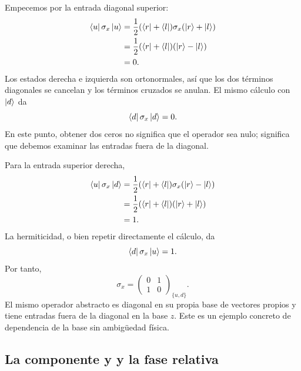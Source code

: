 Empecemos por la entrada diagonal superior:
\begin{align}
\left\langle u\right\rvert\sigma_x\left\lvert u\right\rangle
 &=\frac12(\left\langle r\right\rvert+\left\langle l\right\rvert)\sigma_x(\left\lvert r\right\rangle+\left\lvert l\right\rangle)\\
 &=\frac12(\left\langle r\right\rvert+\left\langle l\right\rvert)(\left\lvert r\right\rangle-\left\lvert l\right\rangle)\\
 &=0.
\end{align}
Los estados derecha e izquierda son ortonormales, así que los dos términos diagonales se cancelan y los términos cruzados se anulan. El mismo cálculo con \(\left\lvert d\right\rangle\) da
\[
\left\langle d\right\rvert\sigma_x\left\lvert d\right\rangle=0.
\]
En este punto, obtener dos ceros no significa que el operador sea nulo; significa que debemos examinar las entradas fuera de la diagonal.

Para la entrada superior derecha,
\begin{align}
\left\langle u\right\rvert\sigma_x\left\lvert d\right\rangle
 &=\frac12(\left\langle r\right\rvert+\left\langle l\right\rvert)\sigma_x(\left\lvert r\right\rangle-\left\lvert l\right\rangle)\\
 &=\frac12(\left\langle r\right\rvert+\left\langle l\right\rvert)(\left\lvert r\right\rangle+\left\lvert l\right\rangle)\\
 &=1.
\end{align}
La hermiticidad, o bien repetir directamente el cálculo, da
\[
\left\langle d\right\rvert\sigma_x\left\lvert u\right\rangle=1.
\]
Por tanto,
\begin{equation}
\boxed{
\sigma_x=
\begin{pmatrix}
0&1\\
1&0
\end{pmatrix}_{\{u,d\}}.}
\label{eq:sigma-x}
\end{equation}
El mismo operador abstracto es diagonal en su propia base de vectores propios y tiene entradas fuera de la diagonal en la base \(z\). Este es un ejemplo concreto de dependencia de la base sin ambigüedad física.

\subsection{La componente y y la fase relativa}

